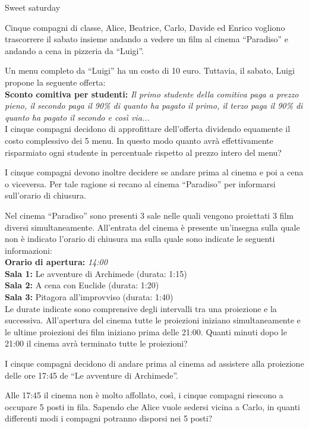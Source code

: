 \documentclass[12pt]{matemaj}
\begin{document}
\titolo Sweet saturday

Cinque compagni di classe, Alice, Beatrice, Carlo, Davide ed Enrico vogliono trascorrere il sabato insieme andando a vedere un film al cinema ``Paradiso'' e andando a cena in pizzeria da ``Luigi''.

\quesito[10;30]
Un menu completo da ``Luigi'' ha un costo di 10 euro. Tuttavia, il sabato, Luigi propone la seguente offerta:\\[6pt]
{\bf Sconto comitiva per studenti: }{\it Il primo studente della comitiva paga a prezzo pieno, il secondo paga il 90\% di quanto ha pagato il primo, il terzo paga il 90\% di quanto ha pagato il secondo e così via...}\\[6pt]
I cinque compagni decidono di approfittare dell'offerta dividendo equamente il costo complessivo dei 5 menu. In questo modo quanto avrà effettivamente risparmiato ogni studente in percentuale rispetto al prezzo intero del menu?

I cinque compagni devono inoltre decidere se andare prima al cinema e poi a cena o viceversa. Per tale ragione si recano al cinema ``Paradiso'' per informarsi sull'orario di chiusura.

\quesito[0;100]
Nel cinema ``Paradiso'' sono presenti 3 sale nelle quali vengono proiettati 3 film diversi simultaneamente. All'entrata del cinema è presente un'insegna sulla quale non è indicato l'orario di chiusura ma sulla quale sono indicate le seguenti informazioni:\\[6pt]
{\bf Orario di apertura: }{\it 14:00}\\[6pt]
{\bf Sala 1: }{Le avventure di Archimede (durata: 1:15)}\\[6pt]
{\bf Sala 2: }{A cena con Euclide (durata: 1:20)}\\[6pt]
{\bf Sala 3: }{Pitagora all'improvviso (durata: 1:40)}\\[6pt]
Le durate indicate sono comprensive degli intervalli tra una proiezione e la successiva. All'apertura del cinema tutte le proiezioni iniziano simultaneamente e le ultime proiezioni dei film iniziano prima delle 21:00. Quanti minuti dopo le 21:00 il cinema avrà terminato tutte le proiezioni?

I cinque compagni decidono di andare prima al cinema ad assistere alla proiezione delle ore 17:45 de ``Le avventure di Archimede''.

\quesito[1;60]
Alle 17:45 il cinema non è molto affollato, così, i cinque compagni riescono a occupare 5 posti in fila. Sapendo che Alice vuole sedersi vicina a Carlo, in quanti differenti modi i compagni potranno disporsi nei 5 posti?
\end{document}
